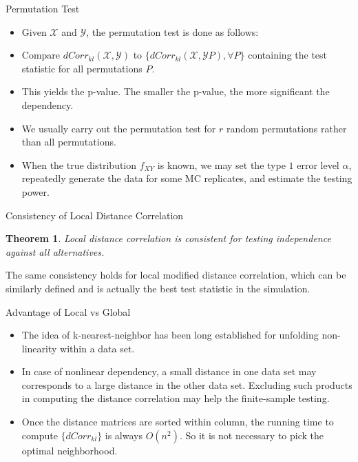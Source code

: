 \documentclass{beamer}
\newtheorem{thm}{Theorem}
\begin{document}
\begin{frame}{Permutation Test}
\begin{itemize}[<+->]
\item Given $\mathcal{X}$ and $\mathcal{Y}$, the permutation test is done as follows:
\item Compare $dCorr_{kl}(\mathcal{X}, \mathcal{Y})$ to $\{dCorr_{kl}(\mathcal{X}, \mathcal{Y}P), \forall P\}$ containing the test statistic for all permutations $P$. 
\item This yields the p-value. The smaller the p-value, the more significant the dependency.
\item We usually carry out the permutation test for $r$ random permutations rather than all permutations.
\item When the true distribution $f_{XY}$ is known, we may set the type $1$ error level $\alpha$, repeatedly generate the data for some MC replicates, and estimate the testing power.
\end{itemize}
\end{frame}

\begin{frame}{Consistency of Local Distance Correlation}
\begin{thm} 
Local distance correlation is consistent for testing independence against all alternatives. 
\end{thm}  
\pause
\medskip
The same consistency holds for local modified distance correlation, which can be similarly defined and is actually the best test statistic in the simulation.
\end{frame}

\begin{frame}{Advantage of Local vs Global}
\begin{itemize}[<+->]
\item The idea of k-nearest-neighbor has been long established for unfolding non-linearity within a data set.
\item In case of nonlinear dependency, a small distance in one data set may corresponds to a large distance in the other data set. Excluding such products in computing the distance correlation may help the finite-sample testing.
\item Once the distance matrices are sorted within column, the running time to compute $\{dCorr_{kl}\}$ is always $O(n^2)$. So it is not necessary to pick the optimal neighborhood.
\end{itemize}
\end{frame}
\end{document}
